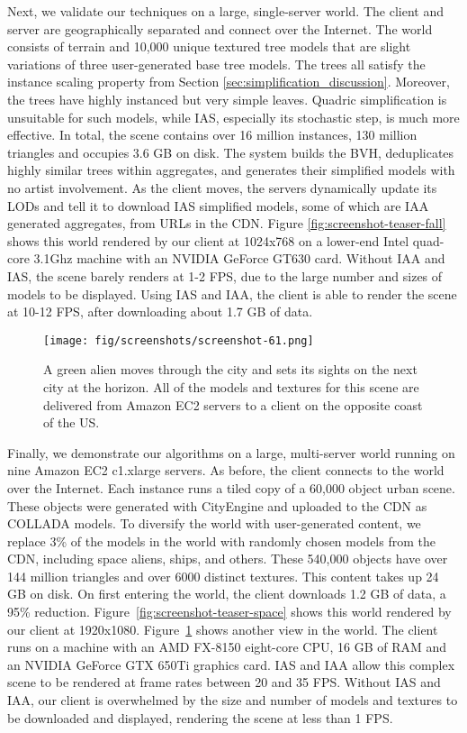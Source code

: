 Next, we validate our techniques on a large, single-server world. 
The client and server are geographically separated
and connect over the Internet. 
The world consists of terrain and
10,000 unique textured tree models that are slight variations of three
user-generated base tree models. The trees all satisfy the instance scaling property
from Section \ref{sec:simplification_discussion}. Moreover, the trees have highly
instanced but very simple leaves. Quadric simplification is unsuitable for such models, while
IAS, especially its stochastic step, is much more effective. 
In total, the scene contains over 16 million
instances, 130 million triangles and occupies 3.6 GB on disk.
The system builds the BVH, deduplicates highly similar trees within aggregates, 
and generates their simplified models with no artist involvement.
As the client moves, the servers
dynamically update its LODs and tell it to download IAS
simplified models, some of which are IAA generated aggregates, from URLs in
the CDN. Figure \ref{fig:screenshot-teaser-fall} shows this world
rendered by our client at 1024x768 on a lower-end Intel
quad-core 3.1Ghz machine with an NVIDIA GeForce GT630 card. Without IAA and IAS, the
scene barely renders at 1-2 FPS, due to the large number and sizes of
models to be displayed. Using IAS and IAA, the client is able to render the scene
at 10-12 FPS, after downloading about 1.7 GB of data.

\begin{figure}
\centering
\texttt{[image: fig/screenshots/screenshot-61.png]}
\caption{A green alien moves through the city and sets its sights
on the next city at the horizon. All of the models and textures for this
scene are delivered from Amazon EC2 servers to a client on the opposite
coast of the US.}
\label{fig:screenshot-alt}
\vspace{-12pt}
\end{figure}


Finally, we demonstrate our algorithms on a large, multi-server world 
running on nine Amazon EC2 c1.xlarge servers. As before, 
the client connects to the world over the Internet.
Each instance runs a tiled copy of a 60,000 object urban scene.  
These objects were
generated with CityEngine and uploaded to the CDN as COLLADA models.
To diversify the world with user-generated content, we
replace 3\% of the models in the world with randomly chosen models
from the CDN, including space aliens, ships, and others. 
These 540,000 objects have over 144 million triangles
and over 6000 distinct textures. This content takes up 24 GB on
disk. On first entering the world, the client downloads 1.2 GB of data,
a 95\% reduction. 
Figure~\ref{fig:screenshot-teaser-space} shows this world rendered by our
client at 1920x1080. Figure~\ref{fig:screenshot-alt} shows another
view in the world. The client runs on a machine with an AMD FX-8150
eight-core CPU, 16 GB of RAM and an NVIDIA GeForce GTX 650Ti graphics
card.  IAS and IAA allow this complex scene to be rendered at frame
rates between 20 and 35 FPS.  Without IAS and IAA, our client is
overwhelmed by the size and number of models and textures to be
downloaded and displayed, rendering the scene at less than 1 FPS.

